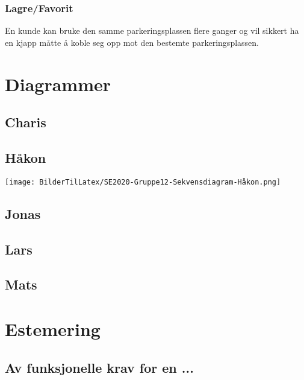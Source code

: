 \documentclass[12pt]{article}
\begin{document}
            \subsubsection{Lagre/Favorit}
            En kunde kan bruke den samme parkeringsplassen flere ganger og vil sikkert ha en kjapp måtte å koble seg opp mot den bestemte parkeringsplassen.

\section{Diagrammer}

    \subsection{Charis}

    \newpage
    \subsection{Håkon}

    \texttt{[image: BilderTilLatex/SE2020-Gruppe12-Sekvensdiagram-Håkon.png]}


    \subsection{Jonas}

    \subsection{Lars}

    \subsection{Mats}

\section{Estemering}

    \subsection{Av funksjonelle krav for en ...}
\end{document}
